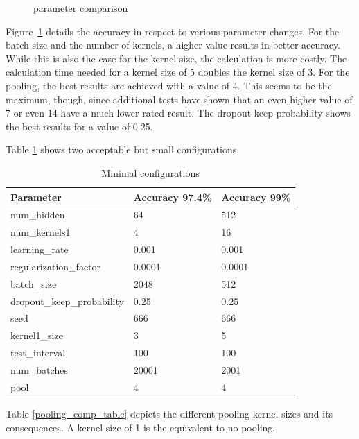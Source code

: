\documentclass{article}
\begin{document}
\begin{enumerate}
\begin{item}
\begin{figure}
			\caption{parameter comparison}
			\label{fig:parameters}
		\end{figure}
		Figure~\ref{fig:parameters} details the accuracy in respect to various parameter changes. For the batch size and the number of kernels, a higher value results in better accuracy. While this is also the case for the kernel size, the calculation is more costly. The calculation time needed for a kernel size of 5 doubles the kernel size of 3. For the pooling, the best results are achieved with a value of 4. This seems to be the maximum, though, since additional tests have shown that an even higher value of 7 or even 14 have a much lower rated result.
		The dropout keep probability shows the best results for a value of 0.25. 
		
	\end{item}
	\begin{item}
		Table \ref{smallest_conf} shows two acceptable but small configurations.
		\begin{table}[h]
			\caption{Minimal configurations}
			\label{smallest_conf}
			\centering
			\begin{tabular}{lll}
				\toprule
				Parameter     & Accuracy 97.4\%     & Accuracy 99\% \\
				\midrule
				num\_hidden & 64 & 512 \\
				num\_kernels1 & 4 & 16 \\
				learning\_rate & 0.001 & 0.001 \\
				regularization\_factor & 0.0001 & 0.0001 \\
				batch\_size & 2048 & 512 \\
				dropout\_keep\_probability & 0.25 & 0.25 \\
				seed & 666 & 666 \\
				kernel1\_size & 3 & 5 \\
				test\_interval & 100 & 100 \\
				num\_batches & 20001 & 2001 \\
				pool & 4 & 4 \\
				
				
				\bottomrule
			\end{tabular}
		\end{table}
	\end{item}
	\begin{item}
		Table \ref{pooling_comp_table} depicts the different pooling kernel sizes and its consequences. A kernel size of 1 is the equivalent to no pooling.
		

\end{item}
\end{enumerate}
\end{document}
